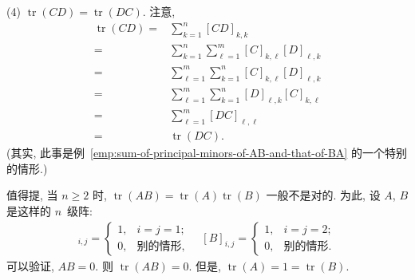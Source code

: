 \documentclass[../libro.tex]{subfiles}
\begin{document}
\begin{example}
    (4)
    \(\operatorname{tr} {(C D)} = \operatorname{tr} {(D C)}\).
    注意,
    \begin{align*}
        \operatorname{tr} {(C D)}
        = {} &
        \sum_{k = 1}^{n} {[C D]_{k,k}}
        \\
        = {} &
        \sum_{k = 1}^{n} {
            \sum_{\ell = 1}^{m} {
                [C]_{k,\ell} [D]_{\ell,k}
            }
        }
        \\
        = {} &
        \sum_{\ell = 1}^{m} {
            \sum_{k = 1}^{n} {
                [C]_{k,\ell} [D]_{\ell,k}
            }
        }
        \\
        = {} &
        \sum_{\ell = 1}^{m} {
            \sum_{k = 1}^{n} {
                [D]_{\ell,k} [C]_{k,\ell}
            }
        }
        \\
        = {} &
        \sum_{\ell = 1}^{m} {[D C]_{\ell,\ell}}
        \\
        = {} &
        \operatorname{tr} {(D C)}.
    \end{align*}
    (其实, 此事是例~\ref{emp:sum-of-principal-minors-of-AB-and-that-of-BA}
    的一个特别的情形.)

    值得提, 当 \(n \geq 2\) 时,
    \(\operatorname{tr} {(A B)}
    = \operatorname{tr} {(A)} \operatorname{tr} {(B)}\)
    一般不是对的.
    为此, 设 \(A\), \(B\) 是这样的 \(n\)~级阵:
    \begin{align*}
        [A]_{i,j} =
        \begin{cases}
            1, & i = j = 1;   \\
            0, & \text{别的情形},
        \end{cases}
        \quad
        [B]_{i,j} =
        \begin{cases}
            1, & i = j = 2;   \\
            0, & \text{别的情形}.
        \end{cases}
    \end{align*}
    可以验证, \(A B = 0\).
    则 \(\operatorname{tr} {(A B)} = 0\).
    但是, \(\operatorname{tr} {(A)} = 1 = \operatorname{tr} {(B)}\).
\end{example}
\end{document}
